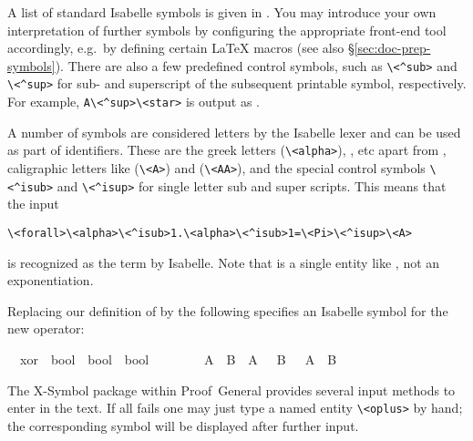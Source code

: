 \begin{isabellebody}
\begin{isamarkuptext}
  A list of standard Isabelle symbols is given in
  \cite[appendix~A]{isabelle-sys}.  You may introduce your own
  interpretation of further symbols by configuring the appropriate
  front-end tool accordingly, e.g.\ by defining certain {\LaTeX}
  macros (see also \S\ref{sec:doc-prep-symbols}).  There are also a
  few predefined control symbols, such as \verb,\,\verb,<^sub>, and
  \verb,\,\verb,<^sup>, for sub- and superscript of the subsequent
  printable symbol, respectively.  For example, \verb,A\<^sup>\<star>, is
  output as .

  A number of symbols are considered letters by the Isabelle lexer 
  and can be used as part of identifiers. These are the greek letters
  \isa{{\isasymalpha}} (\verb+\+\verb+<alpha>+), \isa{{\isasymbeta}}, etc apart from
  \isa{{\isasymlambda}}, caligraphic letters like \isa{{\isasymA}}
  (\verb+\+\verb+<A>+) and \isa{{\isasymAA}} (\verb+\+\verb+<AA>+), 
  and the special control symbols \verb+\+\verb+<^isub>+ and 
  \verb+\+\verb+<^isup>+ for single letter sub and super scripts. This
  means that the input 

  \medskip
  {\small\noindent \verb,\,\verb,<forall>\,\verb,<alpha>\<^isub>1.\,\verb,<alpha>\<^isub>1=\,\verb,<Pi>\<^isup>\<A>,}

  \medskip
  \noindent is recognized as the term  
  by Isabelle. Note that \isa{{\isasymPi}\isactrlisup {\isasymA}} is a single entity like 
  , not an exponentiation.


  \medskip Replacing our definition of  by the following
  specifies an Isabelle symbol for the new operator:%
\end{isamarkuptext}%
\isamarkuptrue%
\isamarkupfalse%
\isamarkupfalse%
\isanewline
\ \ xor\ {\isacharcolon}{\isacharcolon}\ {\isachardoublequote}bool\ {\isasymRightarrow}\ bool\ {\isasymRightarrow}\ bool{\isachardoublequote}\ \ \ \ {\isacharparenleft}\ {\isachardoublequote}{\isasymoplus}{\isachardoublequote}\ {}{}{\isacharparenright}\isanewline
\ \ {\isachardoublequote}A\ {\isasymoplus}\ B\ {\isasymequiv}\ {\isacharparenleft}A\ {\isasymand}\ {\isasymnot}\ B{\isacharparenright}\ {\isasymor}\ {\isacharparenleft}{\isasymnot}\ A\ {\isasymand}\ B{\isacharparenright}{\isachardoublequote}\isamarkupfalse%
\isamarkupfalse%
%
\begin{isamarkuptext}%
\noindent The X-Symbol package within Proof~General provides several
  input methods to enter \isa{{\isasymoplus}} in the text.  If all fails one may
  just type a named entity \verb,\,\verb,<oplus>, by hand; the
  corresponding symbol will be displayed after further input.


\end{isamarkuptext}
\end{isabellebody}
